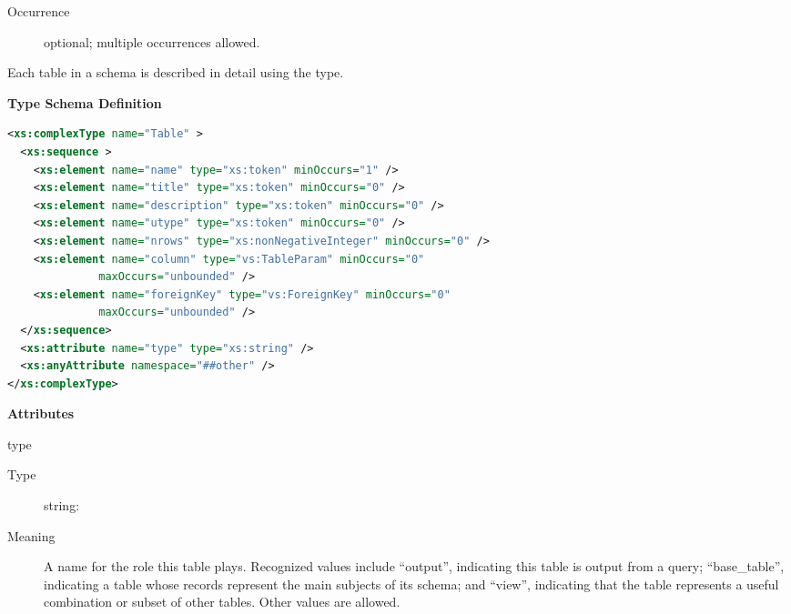 \documentclass[11pt,a4paper]{ivoa}
\begin{document}
\begin{generated}
\begin{bigdescription}
\begin{description}
\item[Occurrence] optional; multiple occurrences allowed.

\end{description}


\end{bigdescription}\endgroup

\endgroup
\end{generated}



Each table in a schema is described in detail using the
 type.



\begin{generated}
\begingroup
      	\renewcommand*\descriptionlabel[1]{%
      	\hbox to 5.5em{\emph{#1}\hfil}}\vspace{1ex}\noindent\textbf{ Type Schema Definition}

\begin{lstlisting}[language=XML,basicstyle=\footnotesize]
<xs:complexType name="Table" >
  <xs:sequence >
    <xs:element name="name" type="xs:token" minOccurs="1" />
    <xs:element name="title" type="xs:token" minOccurs="0" />
    <xs:element name="description" type="xs:token" minOccurs="0" />
    <xs:element name="utype" type="xs:token" minOccurs="0" />
    <xs:element name="nrows" type="xs:nonNegativeInteger" minOccurs="0" />
    <xs:element name="column" type="vs:TableParam" minOccurs="0"
              maxOccurs="unbounded" />
    <xs:element name="foreignKey" type="vs:ForeignKey" minOccurs="0"
              maxOccurs="unbounded" />
  </xs:sequence>
  <xs:attribute name="type" type="xs:string" />
  <xs:anyAttribute namespace="##other" />
</xs:complexType>
\end{lstlisting}

\vspace{0.5ex}\noindent\textbf{ Attributes}

\begingroup\small\begin{bigdescription}
\item[type]
\begin{description}
\item[Type] string: 
\item[Meaning] 
               A name for the role this table plays.  Recognized
               values include “output”, indicating this table is output 
               from a query; “base\_table”, indicating a table
               whose records represent the main subjects of its
               schema; and “view”, indicating that the table represents
               a useful combination or subset of other tables.  Other 
               values are allowed.  
            

\end{description}
\end{bigdescription}
\end{generated}
\end{document}
